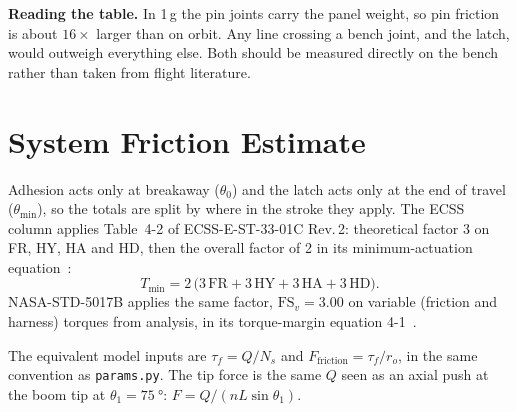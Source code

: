 \documentclass[11pt]{article}
\begin{document}
\vspace{0.6em}
\textbf{Reading the table.} In 1\,g the pin joints carry the panel weight, so pin friction is about
$16\times$ larger than on orbit. Any line crossing a bench joint, and the latch, would outweigh everything
else. Both should be measured directly on the bench rather than taken from flight literature.

\section{System Friction Estimate}
\label{sec:sys}

Adhesion acts only at breakaway ($\theta_0$) and the latch acts only at the end of travel
($\theta_{\min}$), so the totals are split by where in the stroke they apply. The ECSS column applies
Table~4-2 of ECSS-E-ST-33-01C Rev.\,2: theoretical factor 3 on FR, HY, HA and HD, then the overall factor
of 2 in its minimum-actuation equation~\cite{ecss}:
\begin{equation}
T_{\min} = 2\,\big(3\,\text{FR} + 3\,\text{HY} + 3\,\text{HA} + 3\,\text{HD}\big).
\end{equation}
NASA-STD-5017B applies the same factor, $\text{FS}_v = 3.00$ on variable (friction and harness) torques from
analysis, in its torque-margin equation 4-1~\cite{nasa5017}.

The equivalent model inputs are $\tau_f = Q/N_s$ and $F_{\text{friction}} = \tau_f/r_o$, in the same
convention as \texttt{params.py}. The tip force is the same $Q$ seen as an axial push at the boom tip at
$\theta_1=\SI{75}{\degree}$: $F=Q/(nL\sin\theta_1)$.
\end{document}
